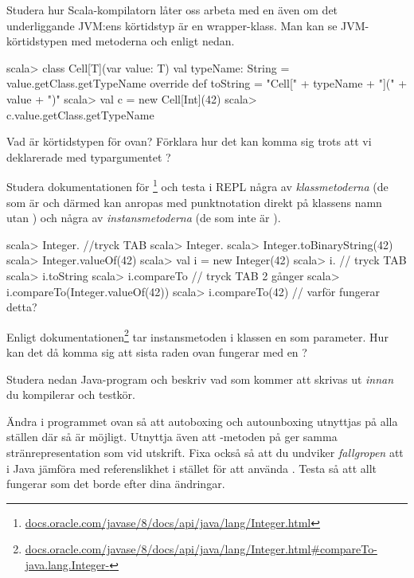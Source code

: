 \Subtask Studera hur Scala-kompilatorn låter oss arbeta med en  även om det underliggande JVM:ens körtidstyp  är en wrapper-klass. Man kan se JVM-körtidstypen med metoderna  och  enligt nedan.
\begin{REPL}
scala> class Cell[T](var value: T){
         val typeName: String = value.getClass.getTypeName
         override def toString = "Cell[" + typeName + "](" + value + ")"
       }
scala> val c = new Cell[Int](42)
scala> c.value.getClass.getTypeName
\end{REPL}


\Subtask Vad är körtidstypen för  ovan? Förklara hur det kan komma sig trots att vi deklarerade med typargumentet ?

\Subtask Studera dokumentationen för \footnote{\href{https://docs.oracle.com/javase/8/docs/api/java/lang/Integer.html}{docs.oracle.com/javase/8/docs/api/java/lang/Integer.html}} och testa i REPL några av \emph{klassmetoderna} (de som är  och därmed kan anropas med punktnotation direkt på klassens namn utan ) och några av \emph{instansmetoderna} (de som inte är ).
\begin{REPL}
scala> Integer.  //tryck TAB
scala> Integer.
scala> Integer.toBinaryString(42)
scala> Integer.valueOf(42)
scala> val i = new Integer(42)
scala> i.  // tryck TAB
scala> i.toString
scala> i.compareTo  // tryck TAB 2 gånger
scala> i.compareTo(Integer.valueOf(42))
scala> i.compareTo(42)  // varför fungerar detta?
\end{REPL}

\Subtask\Pen Enligt dokumentationen\footnote{\href{https://docs.oracle.com/javase/8/docs/api/java/lang/Integer.html\#compareTo-java.lang.Integer-}{docs.oracle.com/javase/8/docs/api/java/lang/Integer.html\#compareTo-java.lang.Integer-}} tar instansmetoden  i klassen  en  som parameter. Hur kan det då komma sig att sista raden ovan fungerar med en ?

\Subtask Studera nedan Java-program och beskriv vad som kommer att skrivas ut \emph{innan} du kompilerar och testkör.


\Subtask Ändra i programmet ovan så att autoboxing och autounboxing utnyttjas på alla ställen där så är möjligt. Utnyttja även att -metoden på  ger samma stränrepresentation som  vid utskrift. Fixa också så att du undviker \emph{fallgropen} att i Java jämföra med referenslikhet i stället för att använda . Testa så att allt fungerar som det borde efter dina ändringar.



